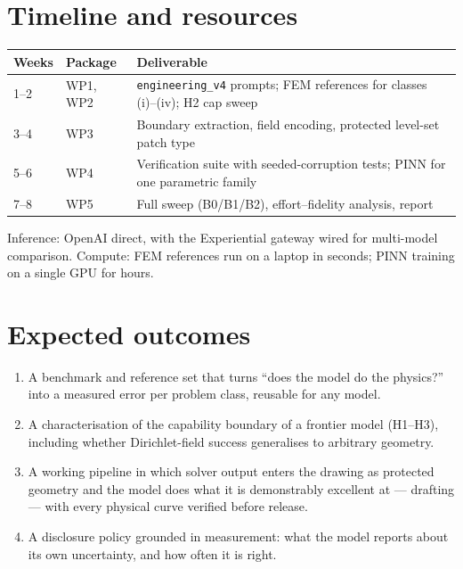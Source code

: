 \documentclass[11pt,a4paper]{article}
\begin{document}
\section{Timeline and resources}
\begin{center}\small
\begin{tabular}{llp{8.6cm}}
\toprule
Weeks & Package & Deliverable \\
\midrule
1--2 & WP1, WP2 & \texttt{engineering\_v4} prompts; FEM references for classes (i)--(iv); H2 cap sweep \\
3--4 & WP3 & Boundary extraction, field encoding, protected level-set patch type \\
5--6 & WP4 & Verification suite with seeded-corruption tests; PINN for one parametric family \\
7--8 & WP5 & Full sweep (B0/B1/B2), effort--fidelity analysis, report \\
\bottomrule
\end{tabular}
\end{center}
Inference: OpenAI direct, with the Experiential gateway wired for multi-model comparison. Compute: FEM references run on a laptop in seconds; PINN training on a single GPU for hours.

\section{Expected outcomes}
\begin{enumerate}[leftmargin=2em]
  \item A benchmark and reference set that turns ``does the model do the physics?'' into a measured error per problem class, reusable for any model.
  \item A characterisation of the capability boundary of a frontier model (H1--H3), including whether Dirichlet-field success generalises to arbitrary geometry.
  \item A working pipeline in which solver output enters the drawing as protected geometry and the model does what it is demonstrably excellent at --- drafting --- with every physical curve verified before release.
  \item A disclosure policy grounded in measurement: what the model reports about its own uncertainty, and how often it is right.
\end{enumerate}

\appendix
\end{document}
